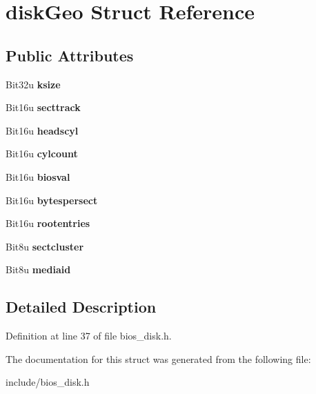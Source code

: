 \hypertarget{structdiskGeo}{\section{disk\-Geo Struct Reference}
\label{structdiskGeo}
}
\subsection*{Public Attributes}
\begin{DoxyCompactItemize}
\item 
\hypertarget{structdiskGeo_abd4f3a12080100ef6625fee835a73f67}{Bit32u {\bfseries ksize}}\label{structdiskGeo_abd4f3a12080100ef6625fee835a73f67}

\item 
\hypertarget{structdiskGeo_a429b8096124fd210c60176218062bea7}{Bit16u {\bfseries secttrack}}\label{structdiskGeo_a429b8096124fd210c60176218062bea7}

\item 
\hypertarget{structdiskGeo_a80d15f791103e8609b0e4fd20b50a55c}{Bit16u {\bfseries headscyl}}\label{structdiskGeo_a80d15f791103e8609b0e4fd20b50a55c}

\item 
\hypertarget{structdiskGeo_a462ae47d0cdb78c1c504d5bd2a388b47}{Bit16u {\bfseries cylcount}}\label{structdiskGeo_a462ae47d0cdb78c1c504d5bd2a388b47}

\item 
\hypertarget{structdiskGeo_a6ebd77ebcb86a90902daa6d223de7b1b}{Bit16u {\bfseries biosval}}\label{structdiskGeo_a6ebd77ebcb86a90902daa6d223de7b1b}

\item 
\hypertarget{structdiskGeo_aab11beac3d73068f943f5bb613fa3b7d}{Bit16u {\bfseries bytespersect}}\label{structdiskGeo_aab11beac3d73068f943f5bb613fa3b7d}

\item 
\hypertarget{structdiskGeo_ab0c3a8d4109181b6907c44eaebedde85}{Bit16u {\bfseries rootentries}}\label{structdiskGeo_ab0c3a8d4109181b6907c44eaebedde85}

\item 
\hypertarget{structdiskGeo_a4bea3286e3153517df893665098a01b0}{Bit8u {\bfseries sectcluster}}\label{structdiskGeo_a4bea3286e3153517df893665098a01b0}

\item 
\hypertarget{structdiskGeo_aa6840d41ea4a20e8c7838399199797fa}{Bit8u {\bfseries mediaid}}\label{structdiskGeo_aa6840d41ea4a20e8c7838399199797fa}

\end{DoxyCompactItemize}


\subsection{Detailed Description}


Definition at line 37 of file bios\-\_\-disk.\-h.



The documentation for this struct was generated from the following file\-:\begin{DoxyCompactItemize}
\item 
include/bios\-\_\-disk.\-h\end{DoxyCompactItemize}
